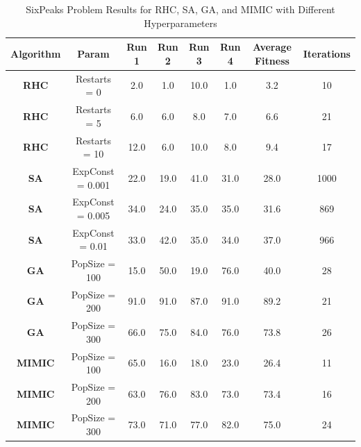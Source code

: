 \begin{table}[h!]
    \centering
    \caption{SixPeaks Problem Results for RHC, SA, GA, and MIMIC with Different Hyperparameters}
    \begin{tabular}{|c|c|c|c|c|c|c|c|}
        \hline
        \textbf{Algorithm} & \textbf{Param} & \textbf{Run 1} & \textbf{Run 2} & \textbf{Run 3} & \textbf{Run 4} & \textbf{Average Fitness} & \textbf{Iterations} \\ \hline
        
        \textbf{RHC} & Restarts = 0 & 2.0 & 1.0 & 10.0 & 1.0 & 3.2 & 10 \\ \hline
        \textbf{RHC} & Restarts = 5 & 6.0 & 6.0 & 8.0 & 7.0 & 6.6 & 21 \\ \hline
        \textbf{RHC} & Restarts = 10 & 12.0 & 6.0 & 10.0 & 8.0 & 9.4 & 17 \\ \hline
        
        \textbf{SA} & ExpConst = 0.001 & 22.0 & 19.0 & 41.0 & 31.0 & 28.0 & 1000 \\ \hline
        \textbf{SA} & ExpConst = 0.005 & 34.0 & 24.0 & 35.0 & 35.0 & 31.6 & 869 \\ \hline
        \textbf{SA} & ExpConst = 0.01 & 33.0 & 42.0 & 35.0 & 34.0 & 37.0 & 966 \\ \hline
        
        \textbf{GA} & PopSize = 100 & 15.0 & 50.0 & 19.0 & 76.0 & 40.0 & 28 \\ \hline
        \textbf{GA} & PopSize = 200 & 91.0 & 91.0 & 87.0 & 91.0 & 89.2 & 21 \\ \hline
        \textbf{GA} & PopSize = 300 & 66.0 & 75.0 & 84.0 & 76.0 & 73.8 & 26 \\ \hline
        
        \textbf{MIMIC} & PopSize = 100 & 65.0 & 16.0 & 18.0 & 23.0 & 26.4 & 11 \\ \hline
        \textbf{MIMIC} & PopSize = 200 & 63.0 & 76.0 & 83.0 & 73.0 & 73.4 & 16 \\ \hline
        \textbf{MIMIC} & PopSize = 300 & 73.0 & 71.0 & 77.0 & 82.0 & 75.0 & 24 \\ \hline
        
    \end{tabular}
    \label{tab:sixpeaks_results}
\end{table}
